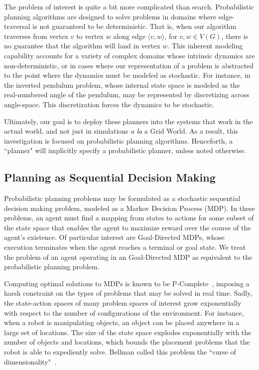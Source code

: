 \documentclass[11pt]{article}
\begin{document}
The problem of interest is quite a bit more complicated than search. Probabilistic planning algorithms are designed to solve problems in domains where edge-traversal is not guaranteed to be deterministic. That is, when our algorithm traverses from vertex $v$ to vertex $w$ along edge $\langle v,w \rangle$, for $v, w \in V(G)$, there is no guarantee that the algorithm will land in vertex $w$. This inherent modeling capability accounts for a variety of complex domains whose intrinsic dynamics are non-deterministic, or in cases where our representation of a problem is abstracted to the point where the dynamics must be modeled as stochastic. For instance, in the inverted pendulum problem, whose internal state space is modeled as the real-numbered angle of the pendulum, may be represented by discretizing across angle-space. This discretization forces the dynamics to be stochastic.

Ultimately, our goal is to deploy these planners into the systems that work in the actual world, and not just in simulations {\it a la} a Grid World. As a result, this investigation is focused on probabilistic planning algorithms. Henceforth, a ``planner" will implicitly specify a probabilistic planner, unless noted otherwise.

\subsection{Planning as Sequential Decision Making}
Probabilistic planning problems may be formulated as a stochastic sequential decision making problem, modeled as a Markov Decision Process (MDP). In these problems, an agent must find a mapping from states to actions for some subset of the state space that enables the agent to maximize reward over the course of the agent's existence. Of particular interest are Goal-Directed MDPs, whose execution terminates when the agent reaches a terminal or goal state. We treat the problem of an agent operating in an Goal-Directed MDP as equivalent to the probabilistic planning problem.

Computing optimal solutions to MDPs is known to be P-Complete~\cite{littman1995complexity}, imposing a harsh constraint on the types of problems that may be solved in real time. Sadly, the state-action spaces of many problem spaces of interest grow exponentially with respect to the number of configurations of the environment.  For instance, when a robot is manipulating objects, an object can be placed anywhere in a large set of locations.  The size of the state space explodes exponentially with the number of objects and locations, which bounds the placement problems that the robot is able to expediently solve. Bellman called this problem the ``curse of dimensionality"~\cite{bellman1961adaptive}.
\end{document}
